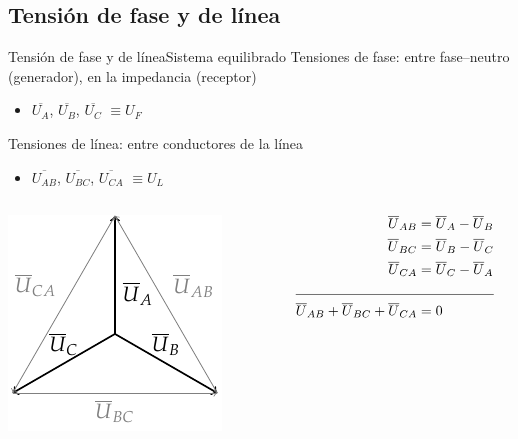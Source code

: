 \documentclass[aspectratio=169, xcolor={usenames,svgnames,dvipsnames}]{beamer}
\begin{document}
\subsection{Tensión de fase y de línea}

\begin{frame}{Tensión de fase y de línea}{Sistema equilibrado}
Tensiones de \alert{fase}: entre fase--neutro (generador), en la impedancia (receptor)
\begin{itemize}
    \item \(\overline{U_A}\), \(\overline{U_B}\), \(\overline{U_C}\) $\equiv U_F$
\end{itemize}

Tensiones de \alert{línea}: entre conductores de la línea
\begin{itemize}
    \item \(\overline{U_{AB}}\), \(\overline{U_{BC}}\), \(\overline{U_{CA}}\) $\equiv U_L$
\end{itemize}

\begin{columns}
\begin{column}{0.4\columnwidth}
\begin{center}
\includegraphics[height=0.4\textheight]{../figs/FasoresTrifasica_ABC.pdf}
\end{center}
\end{column}

\begin{column}{0.6\columnwidth}
\begin{align*}
       \overline{U}_{AB} &= \overline{U}_A - \overline{U}_B\\
       \overline{U}_{BC} &= \overline{U}_B - \overline{U}_C\\
       \overline{U}_{CA} &= \overline{U}_C - \overline{U}_A\\
\cline{1-2}
       \overline{U}_{AB} + \overline{U}_{BC} + \overline{U}_{CA} &= 0     
       \end{align*}
\end{column}
\end{columns}
\end{frame}
\end{document}

